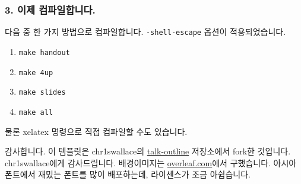 \begin{frame}[fragile]
\frametitle{3. 이제 컴파일합니다.}
다음 중 한 가지 방법으로 컴파일합니다. \lstinline|-shell-escape| 옵션이 적용되었습니다.
\begin{enumerate}
\item \lstinline|make handout|
\item \lstinline|make 4up|
\item \lstinline|make slides|
\item \lstinline|make all|

\end{enumerate}

물론 xelatex 명령으로 직접 컴파일할 수도 있습니다.
\end{frame}


\begin{frame}{감사합니다.}
이 템플릿은 chr1swallace의 \href{https://github.com/chr1swallace/talk-outline}{talk-outline} 저장소에서 fork한 것입니다. chr1swallace에게 감사드립니다. 배경이미지는 \href{https://www.overleaf.com/20113zpkgkf}{overleaf.com}에서 구했습니다. 아시아폰트에서 재밌는 폰트를 많이 배포하는데, 라이센스가 조금 아쉽습니다.
\vfill
\end{frame}



